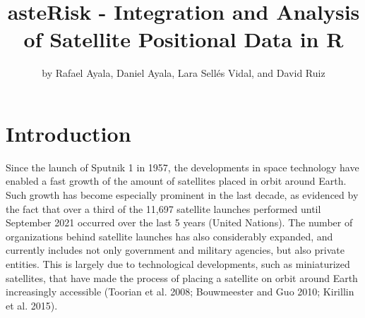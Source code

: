 \title{asteRisk - Integration and Analysis of Satellite Positional Data in R}


\author{by Rafael Ayala, Daniel Ayala, Lara Sellés Vidal, and David Ruiz}

\maketitle


\hypertarget{introduction}{%
\section{Introduction}\label{introduction}}

Since the launch of Sputnik 1 in 1957, the developments in space technology have enabled a fast growth of the amount of satellites placed in orbit around Earth. Such growth has become especially prominent in the last decade, as evidenced by the fact that over a third of the 11,697 satellite launches performed until September 2021 occurred over the last 5 years (United Nations). The number of organizations behind satellite launches has also considerably expanded, and currently includes not only government and military agencies, but also private entities. This is largely due to technological developments, such as miniaturized satellites, that have made the process of placing a satellite on orbit around Earth increasingly accessible (Toorian et al. 2008; Bouwmeester and Guo 2010; Kirillin et al. 2015).

